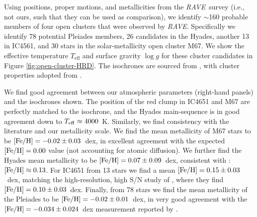 \documentclass[preprint]{aastex}
\newcommand{\acronym}[1]{{\small{#1}}}
\newcommand{\project}[1]{\textsl{#1}}
\newcommand{\rave}{\project{\acronym{RAVE}}}
\newcommand{\teff}{T_{\mathrm{eff}}}
\newcommand{\logg}{\log g}
\begin{document}
Using positions, proper motions, and metallicities from the \rave\ survey
(i.e., not ours, such that they can be used as comparison), we identify $\sim$160 
probable members of four open clusters that were observed by \rave.
Specifically we identify 78 potential Pleiades members, 26 candidates in the
Hyades, another 13 in IC4561, and 30 stars in the solar-metallicity open
cluster M67.
We show the effective temperature $\teff$ and surface gravity $\logg$ for these
cluster candidates in Figure \ref{fig:open-cluster-HRD}.  The isochrones are 
sourced from \citet{Bressan_2012}, with cluster properties adopted from 
\cite{Kharchenko_2013}.  




We find good agreement between our atmospheric parameters (right-hand panels) and the 
isochrones shown.  The position of the red clump in IC4651 and M67 are perfectly matched
to the isochrone, and the Hyades main-sequence is in good agreement down to 
$T_{\rm eff} \approx 4000$~K.  Similarly, we find consistency with the literature and
our metallicity scale.  We find the mean metallicity of M67 stars to be 
$[{\rm Fe/H}] = -0.02 \pm 0.03$~dex, in excellent agreement with the expected 
$[{\rm Fe/H}] = 0.00$ value (not accounting for atomic diffusion).
We further find the Hyades mean metallicity to be $[{\rm Fe/H}] = 0.07 \pm 0.09$~dex,
consistent with \citet{Paulson_2003}: $[{\rm Fe/H}] \approx 0.13$.
For IC4651 from 13 stars we find a mean $[{\rm Fe/H}] = 0.15 \pm 0.03$~dex, matching the
high-resolution, high S/N study of \citet{Pasquini_2004}, where they find 
$[{\rm Fe/H}] = 0.10 \pm 0.03$~dex. Finally, from 78 stars we find the mean
metallicity of the Pleiades to be $[{\rm Fe/H}] = -0.02 \pm 0.01$~dex, in very 
good agreement with the $[{\rm Fe/H}] = -0.034 \pm 0.024$~dex measurement reported by 
\citet{Friel_Boesgaard_1990}.
\end{document}
